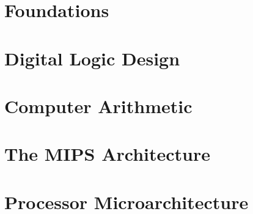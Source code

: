 \documentclass[11pt,fleqn,oneside]{book} %
\begin{document}
\pagestyle{fancy} %


\part{Foundations}





\part{Digital Logic Design}





\part{Computer Arithmetic}




\part{The MIPS Architecture}





\part{Processor Microarchitecture}
\end{document}
